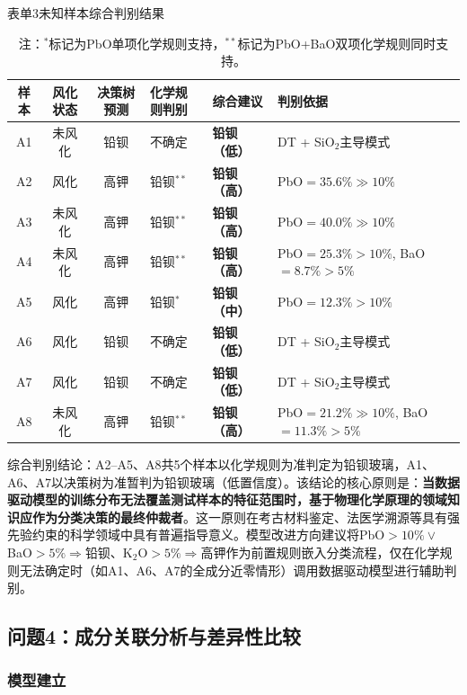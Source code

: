\documentclass[12pt,a4paper]{ctexart}
\begin{document}
\begin{table}[H]
\centering
\caption{表单3未知样本综合判别结果}
\label{tab:unknown_final}
\begin{tabularx}{\textwidth}{cccllY}
\toprule
样本 & 风化状态 & 决策树预测 & 化学规则判别 & \textbf{综合建议} & 判别依据 \\
\midrule
A1 & 未风化 & 铅钡 & 不确定 & \textbf{铅钡（低）} & DT + SiO$_2$主导模式 \\
A2 & 风化 & 高钾 & 铅钡$^{**}$ & \textbf{铅钡（高）} & PbO$=35.6\%\gg10\%$ \\
A3 & 未风化 & 高钾 & 铅钡$^{**}$ & \textbf{铅钡（高）} & PbO$=40.0\%\gg10\%$ \\
A4 & 未风化 & 高钾 & 铅钡$^{**}$ & \textbf{铅钡（高）} & PbO$=25.3\%>10\%$, BaO$=8.7\%>5\%$ \\
A5 & 风化 & 高钾 & 铅钡$^{*}$ & \textbf{铅钡（中）} & PbO$=12.3\%>10\%$ \\
A6 & 风化 & 铅钡 & 不确定 & \textbf{铅钡（低）} & DT + SiO$_2$主导模式 \\
A7 & 风化 & 铅钡 & 不确定 & \textbf{铅钡（低）} & DT + SiO$_2$主导模式 \\
A8 & 未风化 & 高钾 & 铅钡$^{**}$ & \textbf{铅钡（高）} & PbO$=21.2\%\gg10\%$, BaO$=11.3\%>5\%$ \\
\bottomrule
\end{tabularx}
\caption*{注：$^{*}$标记为PbO单项化学规则支持，$^{**}$标记为PbO+BaO双项化学规则同时支持。}
\end{table}

综合判别结论：A2--A5、A8共5个样本以化学规则为准判定为铅钡玻璃，A1、A6、A7以决策树为准暂判为铅钡玻璃（低置信度）。该结论的核心原则是：\textbf{当数据驱动模型的训练分布无法覆盖测试样本的特征范围时，基于物理化学原理的领域知识应作为分类决策的最终仲裁者}。这一原则在考古材料鉴定、法医学溯源等具有强先验约束的科学领域中具有普遍指导意义。模型改进方向建议将PbO$>10\%\lor$BaO$>5\%\Rightarrow$铅钡、K$_2$O$>5\%\Rightarrow$高钾作为前置规则嵌入分类流程，仅在化学规则无法确定时（如A1、A6、A7的全成分近零情形）调用数据驱动模型进行辅助判别。

\newpage

\subsection{问题4：成分关联分析与差异性比较}

\subsubsection{模型建立}
\end{document}
